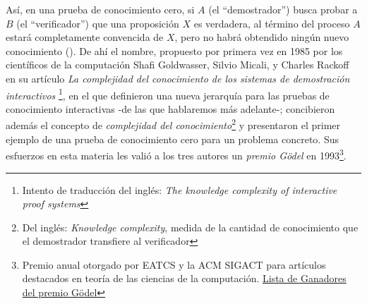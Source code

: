 \documentclass[oneside,10pt]{article}
\begin{document}
Así, en una prueba de conocimiento cero, si $A$ (el ``demostrador'') busca probar a $B$ (el ``verificador'') que una proposición $X$ es verdadera, al término del proceso $A$ estará completamente convencida de $X$, pero no habrá obtendido ningún nuevo conocimiento (\cite{barak}). De ahí el nombre, propuesto por primera vez en
1985 por los científicos de la computación Shafi Goldwasser, Silvio Micali, y Charles Rackoff en su
artículo \textit{La complejidad del conocimiento de los sistemas de demostración interactivos}
\footnote{Intento de traducción del inglés: \textit{The knowledge complexity of interactive
    proof systems}}, en el que definieron una nueva jerarquía para las pruebas de conocimiento
interactivas -de las que hablaremos más adelante-; concibieron además el concepto de
\textit{complejidad del conocimiento}\footnote{Del inglés: \textit{Knowledge complexity}, medida
  de la cantidad de conocimiento que el demostrador transfiere al verificador} y presentaron el primer
ejemplo de una prueba de conocimiento cero para un problema concreto. Sus esfuerzos en esta materia les valió a los tres autores un \textit{premio Gödel} en 1993\footnote{Premio anual otorgado por EATCS y la ACM SIGACT para artículos destacados en teoría de las ciencias de la computación. \href{https://en.wikipedia.org/wiki/G\%C3\%B6del\_Prize}{Lista de Ganadores del premio Gödel}}.
\end{document}

